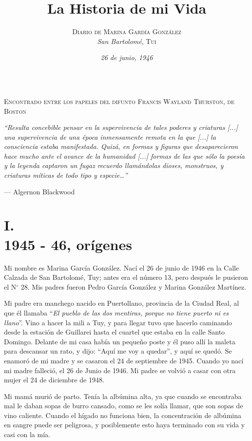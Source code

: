 \documentclass[12pt,a5paper]{book}
\title{\textbf{ \Huge La Historia de mi Vida}}
\author{\textsc{Diario de Marina Gardía González}\\ {\footnotesize \textit{San Bartolomé}, \textsc{Tui}}}
\date{\textit{26 de junio, 1946}}
\begin{document}
\maketitle


\[\]
\pagebreak

\begin{center}
\textsc{Encontrado entre los papeles del difunto Francis Wayland Thurston, de Boston}  
\end{center}

\textit{``Resulta concebible pensar en la supervivencia de tales poderes y criaturas [...] una supervivencia de una época inmensamente remota en la que [...] la consciencia estaba manifestada. Quizá, en formas y figuras que desaparecieron hace mucho ante el avance de la humanidad [...] formas de las que sólo la poesía y la leyenda captaron un fugaz recuerdo llamándolas dioses, monstruos, y criaturas míticas de todo tipo y especie…''}
\begin{flushright}
--- Algernon Blackwood
\end{flushright}



\section*{I.\\1945 - 46, orígenes}

Mi nombre es Marina García González. Nací el 26 de junio de 1946 en la Calle Calzada de San Bartolomé, Tuy; antes era el número 13, pero después le pusieron el N$^\circ$ 28. Mis padres fueron Pedro García González y Marina González Martínez. 

Mi padre era manchego nacido en Puertollano, provincia de la Ciudad Real, al que él llamaba ``\textit{El pueblo de las dos mentiras, porque no tiene puerto ni es llano}''. Vino a hacer la mili a Tuy, y para llegar tuvo que hacerlo caminando desde la estación de Guillarei hasta el cuartel que estaba en la calle Santo Domingo. Delante de mi casa había un pequeño poste y él puso allí la maleta para descansar un rato, y dijo: “Aquí me voy a  quedar”, y aquí se quedó. Se enamoró de mi madre y se casaron el 24 de septiembre de 1945. Cuando yo nací mi madre falleció, el 26 de Junio de 1946. Mi padre se volvió a casar con otra mujer el 24 de diciembre de 1948.

Mi mamá murió de parto. Tenía la albúmina alta, ya que cuando se encontraba mal le daban sopas de burro cansado, como se les solía llamar, que son sopas de vino caliente. Cuando el hígado no funciona bien, la concentración de albúmina en sangre puede ser peligrosa, y posiblemente esto haya terminado con su vida y casi con la mía.
\end{document}

